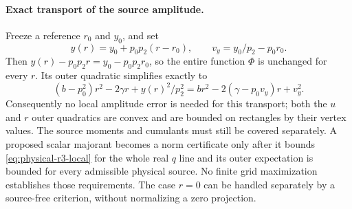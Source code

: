 \documentclass[11pt]{article}
\begin{document}
\paragraph{Exact transport of the source amplitude.}
Freeze a reference $r_0$ and $y_0$, and set
\[
 y(r)=y_0+p_0p_2(r-r_0),\qquad v_y=y_0/p_2-p_0r_0.
\]
Then $y(r)-p_0p_2r=y_0-p_0p_2r_0$, so the entire function $\Phi$ is
unchanged for every $r$.  Its outer quadratic simplifies exactly to
\begin{equation}\label{eq:physical-r3-transport}
 (b-p_0^2)r^2-2\gamma r+y(r)^2/p_2^2
 =br^2-2(\gamma-p_0v_y)r+v_y^2.
\end{equation}
Consequently no local amplitude error is needed for this transport;
both the $u$ and $r$ outer quadratics are convex and are bounded on
rectangles by their vertex values.  The source moments and cumulants
must still be covered separately.  A proposed scalar majorant becomes
a norm certificate only after it bounds \eqref{eq:physical-r3-local}
for the whole real $q$ line and its outer expectation is bounded for
every admissible physical source.  No finite grid maximization establishes
those requirements.  The case $r=0$ can be handled separately by a
source-free criterion, without normalizing a zero projection.
\end{document}
